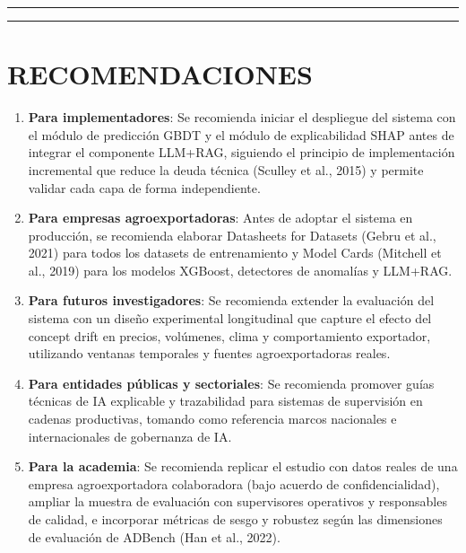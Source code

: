 \begin{center}\rule{0.5\linewidth}{0.5pt}\end{center}

\begin{center}\rule{0.5\linewidth}{0.5pt}\end{center}

\section{RECOMENDACIONES}\label{recomendaciones}

\begin{enumerate}
\def\labelenumi{\arabic{enumi}.}
\item
  \textbf{Para implementadores}: Se recomienda iniciar el despliegue del
  sistema con el módulo de predicción GBDT y el módulo de explicabilidad
  SHAP antes de integrar el componente LLM+RAG, siguiendo el principio
  de implementación incremental que reduce la deuda técnica (Sculley et
  al., 2015) y permite validar cada capa de forma independiente.
\item
  \textbf{Para empresas agroexportadoras}: Antes de adoptar el sistema
  en producción, se recomienda elaborar Datasheets for Datasets (Gebru
  et al., 2021) para todos los datasets de entrenamiento y Model Cards
  (Mitchell et al., 2019) para los modelos XGBoost, detectores de
  anomalías y LLM+RAG.
\item
  \textbf{Para futuros investigadores}: Se recomienda extender la
  evaluación del sistema con un diseño experimental longitudinal que
  capture el efecto del concept drift en precios, volúmenes, clima y
  comportamiento exportador, utilizando ventanas temporales y fuentes
  agroexportadoras reales.
\item
  \textbf{Para entidades públicas y sectoriales}: Se recomienda promover
  guías técnicas de IA explicable y trazabilidad para sistemas de
  supervisión en cadenas productivas, tomando como referencia marcos
  nacionales e internacionales de gobernanza de IA.
\item
  \textbf{Para la academia}: Se recomienda replicar el estudio con datos
  reales de una empresa agroexportadora colaboradora (bajo acuerdo de
  confidencialidad), ampliar la muestra de evaluación con supervisores
  operativos y responsables de calidad, e incorporar métricas de sesgo y
  robustez según las dimensiones de evaluación de ADBench (Han et al.,
  2022).
\end{enumerate}

